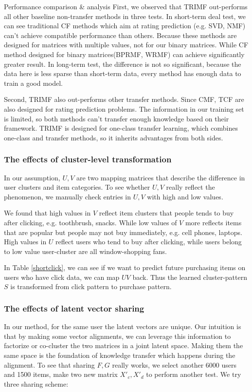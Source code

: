\begin{section}{Performance comparison \& analysis}
First, we observed that TRIMF out-performs all other baseline non-transfer methods in three tests. In short-term deal test, we can see traditional CF methods which aim at rating prediction (e.g. SVD, NMF) can't achieve compatible performance than others. Because these methods are designed for matrices with multiple values, not for our binary matrices. While CF method designed for binary matrices(BPRMF, WRMF) can achieve significantly greater result. In long-term test, the difference is not so significant, because the data here is less sparse than short-term data, every method has enough data to train a good model.

Second, TRIMF also out-performs other transfer methods. Since CMF, TCF are also designed for rating prediction problems. The information in our training set is limited, so both methods can't transfer enough knowledge based on their framework. TRIMF is designed for one-class transfer learning, which combines one-class and transfer methods, so it inherits advantages from both sides.

  \subsubsection{The effects of cluster-level transformation}
In our assumption, $U,V$ are two mapping matrices that describe the difference in user clusters and item categories. To see whether $U,V$ really reflect the phenomenon, we manually check entries in $U,V$ with high and low values.

  We found that high values in $V$ reflect item clusters that people tends to buy after clicking, e.g. toothbrush, snacks. While low values of $V$ more reflects items that are popular but people may not buy immediately, e.g. cell phones, laptops. High values in $U$ reflect users who tend to buy after clicking, while users belong to low value user-cluster are all window-shopping fans.

  In Table \ref{shortclick}, we can see if we want to predict future purchasing items on users who have click data, we can map $UV$ back. Thus the learned cluster-pattern $S$ is transformed from click pattern to purchase pattern.

  \subsubsection{The effects of latent vector sharing}
  	In our method, for the same user the latent vectors are unique. Our intuition is that by making some vector alignments, we can leverage this information to factorize or co-cluster the two matrices in a joint latent space. Making them the same space is the foundation of knowledge transfer which happens during the alignment.
    To see that sharing $F,G$ really works, we select another 6000 users and 1500 items, make two new matrix $X'_c, X'_d$ to perform another test. We try three sharing scheme: 
    

\end{section}
